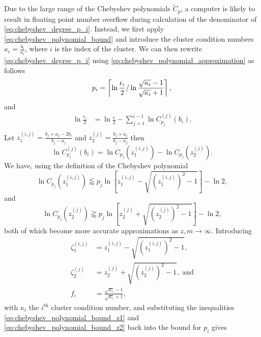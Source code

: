 Due to the large range of the Chebyshev polynomials $\tilde{C}_p$, a computer is likely to result in floating point number overflow during calculation of the denominator of \cref{eq:chebyshev_degree_p_i}. Instead, we first apply \cref{eq:chebyshev_polynomial_bound} and introduce the cluster condition numbers $\kappa_i = \frac{b_i}{a_i}$, where $i$ is the index of the cluster. We can then rewrite \cref{eq:chebyshev_degree_p_i} using \cref{eq:chebyshev_polynomial_approximation} as follows
\begin{equation*}
    p_i  =  \left\lceil\ln{\frac{\epsilon_i}{2}} / \ln{\frac{\sqrt{\kappa_i} - 1}{\sqrt{\kappa_i} + 1}}\right\rceil, \\
\end{equation*}
and
\begin{align*}
    \ln{\frac{\epsilon_i}{2}} & = \ln{\frac{\epsilon}{2}} - \sum_{j=1}^{i-1} \ln{C^{(j)}_{p_j}(b_i)}. \\
\end{align*}
Let $z^{(i,j)}_1 = \frac{b_j + a_j - 2b_i}{b_j - a_j}$ and $z^{(j)}_2 = \frac{b_j + a_j}{b_j - a_j}$ then
\begin{equation*}
    \ln{C^{(j)}_{p_j}(b_i)} = \ln{C_{p_j}(z^{(i,j)}_1)} - \ln{C_{p_j}(z^{(j)}_2)}.
\end{equation*}
We have, using the definition of the Chebyshev polynomial
\begin{equation}
    \ln{C_{p_j}(z^{(i,j)}_1)} \lessapprox p_j \ln{\left[z^{(i,j)}_1 - \sqrt{\left(z^{(i,j)}_1\right)^2 - 1}\right]} - \ln{2},
    \label{eq:chebyshev_polynomial_bound_z1}
\end{equation}
and
\begin{equation}
    \ln{C_{p_j}(z^{(j)}_2)} \gtrapprox p_j \ln{\left[z^{(j)}_2 + \sqrt{\left(z^{(j)}_2\right)^2 - 1}\right]} - \ln{2},
    \label{eq:chebyshev_polynomial_bound_z2}
\end{equation}
both of which become more accurate approximations as $z,m\rightarrow\infty$. Introducing 
\begin{align*}
    \zeta^{(i,j)}_1 &= z^{(i,j)}_1 - \sqrt{\left(z^{(i,j)}_1\right)^2 - 1}, \\
    \zeta^{(j)}_2 &= z^{(j)}_2 + \sqrt{\left(z^{(j)}_2\right)^2 - 1}, \text{ and}\\
    f_i &= \frac{\sqrt{\kappa_i} - 1}{\sqrt{\kappa_i} + 1},
\end{align*}
with $\kappa_i$ the $i^{\text{th}}$ cluster condition number, and substituting the inequalities \ref{eq:chebyshev_polynomial_bound_z1} and \ref{eq:chebyshev_polynomial_bound_z2} back into the bound for $p_i$ gives
